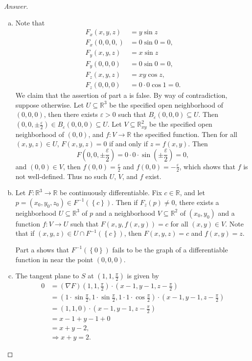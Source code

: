 \documentclass[12pt]{article}
\newcommand{\real}{\mathbb{R}}
\newcommand\inv[1]{#1^{-1}}
\newcommand\paren[1]{\left( #1 \right)}
\newcommand\setb[1]{\left \{ #1 \right \}}
\newcommand{\eps}{\varepsilon}
\theoremstyle{definition}
\begin{document}
\begin{proof}[Answer]
    \noindent
    \begin{enumerate}[a.]
        \item Note that 
        \begin{align*}
            F_x(x,y,z) & = y \sin z \\
            F_x(0,0,0,) & = 0 \sin 0 = 0 , \\
            F_y(x,y,z) & = x \sin z \\
            F_y(0,0,0) & = 0 \sin 0 = 0 , \\
            F_z(x,y,z) & = xy \cos z , \\
            F_z(0,0,0) & = 0 \cdot 0 \cos 1 = 0.
        \end{align*}
        We claim that the assertion of part a is false. By way of contradiction, suppose otherwise. Let $U \subseteq \real^3$ be the specified open neighborhood of $(0,0,0)$, then there exists $\eps > 0$ such that $B_{\eps}(0,0,0) \subseteq U$. Then $\paren{ 0 , 0 , \pm \frac{\eps}{2} } \in B_{\eps}(0,0,0) \subseteq U$. Let $V \subseteq \real^2_{xy}$ be the specified open neighborhood of $(0,0)$, and $f : V \to \real$ the specified function. Then for all $(x,y,z) \in U$, $F(x,y,z) = 0$ if and only if $z = f(x,y)$. Then 
        \[
            F \paren{ 0 , 0 , \pm \frac{\eps}{2} } = 0 \cdot 0 \cdot \sin \paren{ \pm \frac{\eps}{2} } = 0 , 
        \]
        and $(0,0) \in V$, then $f(0,0) = \frac{\eps}{2}$ and $f(0,0) = -\frac{\eps}{2}$, which shows that $f$ is not well-defined. Thus no such $U$, $V$, and $f$ exist. 
        \item Let $F : \real^3 \to \real$ be continuously differentiable. Fix $c \in \real$, and let $p = \paren{ x_0 , y_0 , z_0 } \in \inv{F} \paren{ \setb{ c } }$. Then if $F_z(p) \neq 0$, there exists a neighborhood $U \subseteq \real^3$ of $p$ and a neighborhood $V \subseteq \real^2$ of $\paren{ x_0 , y_0 }$ and a function $f : V \to U$ such that $F(x,y,f(x,y)) = c$ for all $(x,y) \in V$. Note that if $(x,y,z) \in U \cap \inv{F} \paren{ \setb{ c } }$, then $F(x,y,z) = c$ and $f(x,y) = z$.
        
        Part a shows that $\inv{F} \paren{ \setb{ 0 } }$ fails to be the graph of a differentiable function in near the point $(0,0,0)$. 
        \item The tangent plane to $S$ at $\paren{ 1 , 1 , \frac{\pi}{2} }$ is given by 
        \begin{align*}
            0 & = (\nabla F) \paren{ 1 , 1 , \frac{\pi}{2} } \cdot \paren{x - 1 , y - 1 , z - \frac{\pi}{2} } \\
            & = \paren{ 1 \cdot \sin \frac{\pi}{2} , 1 \cdot \sin \frac{\pi}{2} , 1 \cdot 1 \cdot \cos \frac{\pi}{2} } \cdot \paren{x - 1 , y - 1 , z - \frac{\pi}{2} } \\
            & = (1,1,0) \cdot \paren{x - 1 , y - 1 , z - \frac{\pi}{2} } \\
            & = x - 1 + y - 1 + 0 \\
            & = x + y - 2, \\
            & \Rightarrow \boxed{ x + y = 2. }
        \end{align*}
    \end{enumerate}
\end{proof}
\end{document}
